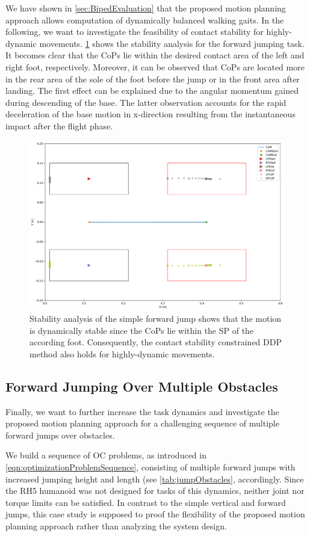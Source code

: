 We have shown in \cref{sec:BipedEvaluation} that the proposed motion planning approach allows computation of dynamically balanced walking gaits. In the following, we want to investigate the feasibility of contact stability for highly-dynamic movements. \cref{fig:jumpForward_StabilityAnalysis} shows the stability analysis for the forward jumping task. It becomes clear that the \gls{CoP}s lie within the desired contact area of the left and right foot, respectively. Moreover, it can be observed that \gls{CoP}s are located more in the rear area of the sole of the foot before the jump or in the front area after landing. The first effect can be explained due to the angular momentum gained during descending of the base. The latter observation accounts for the rapid deceleration of the base motion in x-direction resulting from the instantaneous impact after the flight phase.    
\begin{figure}[h!]
\centering	
\includegraphics[width=.7\textwidth]{fig/jumpForward/StabilityAnalysis}
\caption[Stability analysis of the simple forward jump]{Stability analysis of the simple forward jump shows that the motion is dynamically stable since the \gls{CoP}s lie within the \gls{SP} of the according foot. Consequently, the contact stability constrained \gls{DDP} method also holds for highly-dynamic movements. }
\label{fig:jumpForward_StabilityAnalysis}
\end{figure} 

\subsection{Forward Jumping Over Multiple Obstacles}
Finally, we want to further increase the task dynamics and investigate the proposed motion planning approach for a challenging sequence of multiple forward jumps over obstacles. 

We build a sequence of \gls{OC} problems, as introduced in \cref{eqn:optimizationProblemSequence}, consisting of multiple forward jumps with increased jumping height and length (see \cref{tab:jumpObstacles}, accordingly. Since the RH5 humanoid was not designed for tasks of this dynamics, neither joint nor torque limits can be satisfied. In contrast to the simple vertical and forward jumps, this case study is supposed to proof the flexibility of the proposed motion planning approach rather than analyzing the system design. 

